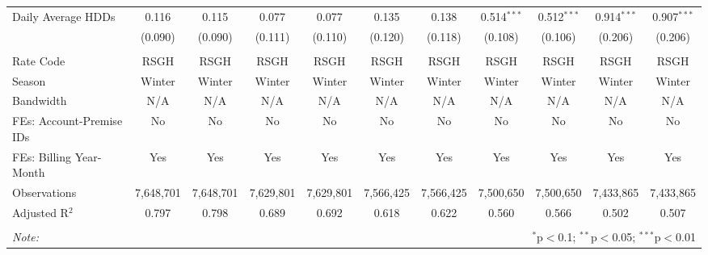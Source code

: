 \begin{table}[!htbp]
\begin{adjustbox}{scale = 0.75}
\begin{tabular}{@{\extracolsep{5pt}}lcccccccccc}
 Daily Average HDDs & 0.116 & 0.115 & 0.077 & 0.077 & 0.135 & 0.138 & 0.514$^{***}$ & 0.512$^{***}$ & 0.914$^{***}$ & 0.907$^{***}$ \\ 
  & (0.090) & (0.090) & (0.111) & (0.110) & (0.120) & (0.118) & (0.108) & (0.106) & (0.206) & (0.206) \\ 
\hline \\[-1.8ex] 
Rate Code & RSGH & RSGH & RSGH & RSGH & RSGH & RSGH & RSGH & RSGH & RSGH & RSGH \\ 
Season & Winter & Winter & Winter & Winter & Winter & Winter & Winter & Winter & Winter & Winter \\ 
Bandwidth & N/A & N/A & N/A & N/A & N/A & N/A & N/A & N/A & N/A & N/A \\ 
FEs: Account-Premise IDs & No & No & No & No & No & No & No & No & No & No \\ 
FEs: Billing Year-Month & Yes & Yes & Yes & Yes & Yes & Yes & Yes & Yes & Yes & Yes \\ 
Observations & 7,648,701 & 7,648,701 & 7,629,801 & 7,629,801 & 7,566,425 & 7,566,425 & 7,500,650 & 7,500,650 & 7,433,865 & 7,433,865 \\ 
Adjusted R$^{2}$ & 0.797 & 0.798 & 0.689 & 0.692 & 0.618 & 0.622 & 0.560 & 0.566 & 0.502 & 0.507 \\ 
\hline 
\hline \\[-1.8ex] 
\textit{Note:}  & \multicolumn{10}{r}{$^{*}$p$<$0.1; $^{**}$p$<$0.05; $^{***}$p$<$0.01} \\ 
\end{tabular}
\end{adjustbox}
\end{table} 
